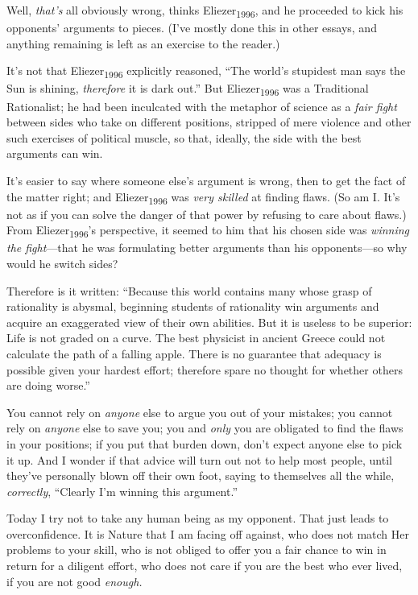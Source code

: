 {
 Well, \textit{that's} all obviously wrong, thinks
Eliezer\textsubscript{1996}, and he proceeded to kick his
opponents' arguments to pieces. (I've
mostly done this in other essays, and anything remaining is left as an
exercise to the reader.)}

{
 It's not that Eliezer\textsubscript{1996}
explicitly reasoned, ``The world's
stupidest man says the Sun is shining, \textit{therefore} it is dark
out.'' But Eliezer\textsubscript{1996} was a
Traditional Rationalist; he had been inculcated with the metaphor of
science as a \textit{fair fight} between sides who take on different
positions, stripped of mere violence and other such exercises of
political muscle, so that, ideally, the side with the best arguments
can win.}

{
 It's easier to say where someone
else's argument is wrong, then to get the fact of the
matter right; and Eliezer\textsubscript{1996} was \textit{very skilled}
at finding flaws. (So am I. It's not as if you can
solve the danger of that power by refusing to care about flaws.) From
Eliezer\textsubscript{1996}'s perspective, it seemed to
him that his chosen side was \textit{winning the fight}{}---that he was
formulating better arguments than his opponents---so why would he
switch sides?}

{
 Therefore is it written: ``Because this world
contains many whose grasp of rationality is abysmal, beginning students
of rationality win arguments and acquire an exaggerated view of their
own abilities. But it is useless to be superior: Life is not graded on
a curve. The best physicist in ancient Greece could not calculate the
path of a falling apple. There is no guarantee that adequacy is
possible given your hardest effort; therefore spare no thought for
whether others are doing worse.''}

{
 You cannot rely on \textit{anyone} else to argue you out of your
mistakes; you cannot rely on \textit{anyone} else to save you; you and
\textit{only} you are obligated to find the flaws in your positions; if
you put that burden down, don't expect anyone else to
pick it up. And I wonder if that advice will turn out not to help most
people, until they've personally blown off their own
foot, saying to themselves all the while, \textit{correctly},
``Clearly I'm winning this
argument.''}

{
 Today I try not to take any human being as my opponent. That just
leads to overconfidence. It is Nature that I am facing off against, who
does not match Her problems to your skill, who is not obliged to offer
you a fair chance to win in return for a diligent effort, who does not
care if you are the best who ever lived, if you are not good
\textit{enough.}}

